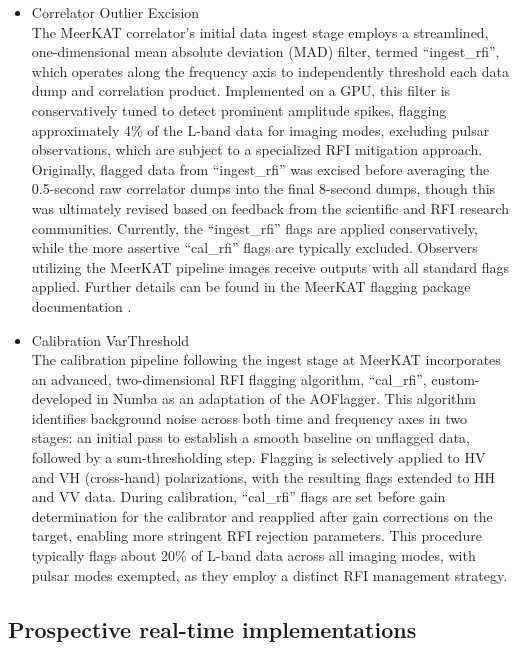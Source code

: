 \begin{itemize}
\item Correlator Outlier Excision\\
The MeerKAT correlator's initial data ingest stage employs a streamlined, one-dimensional mean absolute deviation (MAD) filter, termed ``ingest\_rfi'', which operates along the frequency axis to independently threshold each data dump and correlation product. Implemented on a GPU, this filter is conservatively tuned to detect prominent amplitude spikes, flagging approximately 4\% of the L-band data for imaging modes, excluding pulsar observations, which are subject to a specialized RFI mitigation approach. Originally, flagged data from ``ingest\_rfi'' was excised before averaging the 0.5-second raw correlator dumps into the final 8-second dumps, though this was ultimately revised based on feedback from the scientific and RFI research communities. Currently, the ``ingest\_rfi'' flags are applied conservatively, while the more assertive ``cal\_rfi'' flags are typically excluded. Observers utilizing the MeerKAT pipeline images receive outputs with all standard flags applied. Further details can be found in the MeerKAT flagging package documentation \citep{hugo2022tricolouroptimizedsumthresholdflagger}.

\item Calibration VarThreshold\\
The calibration pipeline following the ingest stage at MeerKAT incorporates an advanced, two-dimensional RFI flagging algorithm, ``cal\_rfi'', custom-developed in Numba as an adaptation of the AOFlagger. This algorithm identifies background noise across both time and frequency axes in two stages: an initial pass to establish a smooth baseline on unflagged data, followed by a sum-thresholding step. Flagging is selectively applied to HV and VH (cross-hand) polarizations, with the resulting flags extended to HH and VV data. During calibration, ``cal\_rfi'' flags are set before gain determination for the calibrator and reapplied after gain corrections on the target, enabling more stringent RFI rejection parameters. This procedure typically flags about 20\% of L-band data across all imaging modes, with pulsar modes exempted, as they employ a distinct RFI management strategy.


\end{itemize}

\subsection{Prospective real-time implementations}
\label{subsection:hardware:catalog:prospective}

